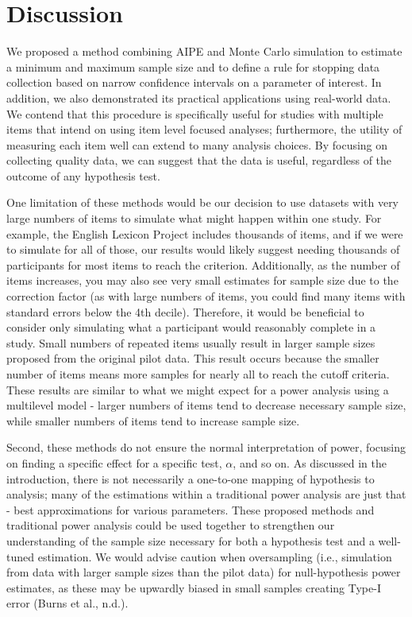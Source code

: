 \documentclass[
  man]{apa7}
\begin{document}
\section{Discussion}\label{discussion}

We proposed a method combining AIPE and Monte Carlo simulation to estimate a minimum and maximum sample size and to define a rule for stopping data collection based on narrow confidence intervals on a parameter of interest. In addition, we also demonstrated its practical applications using real-world data. We contend that this procedure is specifically useful for studies with multiple items that intend on using item level focused analyses; furthermore, the utility of measuring each item well can extend to many analysis choices. By focusing on collecting quality data, we can suggest that the data is useful, regardless of the outcome of any hypothesis test.

One limitation of these methods would be our decision to use datasets with very large numbers of items to simulate what might happen within one study. For example, the English Lexicon Project includes thousands of items, and if we were to simulate for all of those, our results would likely suggest needing thousands of participants for most items to reach the criterion. Additionally, as the number of items increases, you may also see very small estimates for sample size due to the correction factor (as with large numbers of items, you could find many items with standard errors below the 4th decile). Therefore, it would be beneficial to consider only simulating what a participant would reasonably complete in a study. Small numbers of repeated items usually result in larger sample sizes proposed from the original pilot data. This result occurs because the smaller number of items means more samples for nearly all to reach the cutoff criteria. These results are similar to what we might expect for a power analysis using a multilevel model - larger numbers of items tend to decrease necessary sample size, while smaller numbers of items tend to increase sample size.

Second, these methods do not ensure the normal interpretation of power, focusing on finding a specific effect for a specific test, \(\alpha\), and so on. As discussed in the introduction, there is not necessarily a one-to-one mapping of hypothesis to analysis; many of the estimations within a traditional power analysis are just that - best approximations for various parameters. These proposed methods and traditional power analysis could be used together to strengthen our understanding of the sample size necessary for both a hypothesis test and a well-tuned estimation. We would advise caution when oversampling (i.e., simulation from data with larger sample sizes than the pilot data) for null-hypothesis power estimates, as these may be upwardly biased in small samples creating Type-I error (Burns et al., n.d.).
\end{document}
